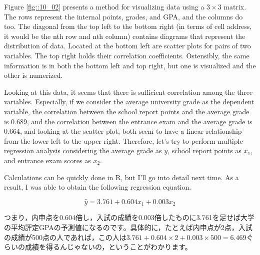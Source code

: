 \documentclass{ltjbook}
\begin{document}

Figure \ref{fig::10_02} presents a method for visualizing data using a $3 \times 3$ matrix. The rows represent the internal points, grades, and GPA, and the columns do too. The diagonal from the top left to the bottom right (in terms of cell address, it would be the nth row and nth column) contains diagrams that represent the distribution of data. Located at the bottom left are scatter plots for pairs of two variables. The top right holds their correlation coefficients. Ostensibly, the same information is in both the bottom left and top right, but one is visualized and the other is numerized.

Looking at this data, it seems that there is sufficient correlation among the three variables. Especially, if we consider the average university grade as the dependent variable, the correlation between the school report points and the average grade is 0.689, and the correlation between the entrance exam and the average grade is 0.664, and looking at the scatter plot, both seem to have a linear relationship from the lower left to the upper right. Therefore, let's try to perform multiple regression analysis considering the average grade as $y$, school report points as $x_1$, and entrance exam scores as $x_2$.

Calculations can be quickly done in R, but I'll go into detail next time. As a result, I was able to obtain the following regression equation.

\[ \hat{y} = 3.761+0.604x_1+0.003x_2 \]

つまり，内申点を0.604倍し，入試の成績を0.003倍したものに3.761を足せば大学の平均評定GPAの予測値になるのです。具体的に，たとえば内申点が2点，入試の成績が500点の人であれば，この人は$3.761+0.604\times2+0.003\times500=6.469$ぐらいの成績を得るんじゃないの，ということがわかります。
\end{document}
